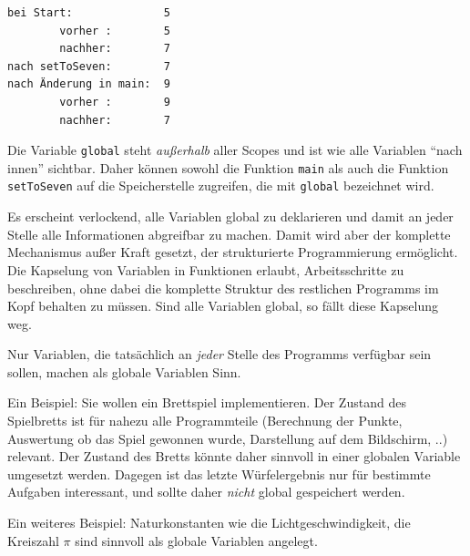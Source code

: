 \begin{cmdbox}
\begin{verbatim}
bei Start:              5
        vorher :        5
        nachher:        7
nach setToSeven:        7
nach Änderung in main:  9
        vorher :        9
        nachher:        7
\end{verbatim}
\end{cmdbox}

Die Variable \texttt{global} steht \emph{außerhalb} aller Scopes und ist wie alle Variablen \enquote{nach innen} sichtbar. Daher können sowohl die Funktion \texttt{main} als auch die Funktion \texttt{setToSeven} auf die Speicherstelle zugreifen, die mit \texttt{global} bezeichnet wird.

\begin{warnbox}
Es erscheint verlockend, alle Variablen global zu deklarieren und damit an jeder Stelle alle Informationen abgreifbar zu machen. Damit wird aber der komplette Mechanismus außer Kraft gesetzt, der strukturierte Programmierung ermöglicht. Die Kapselung von Variablen in Funktionen erlaubt, Arbeitsschritte zu beschreiben, ohne dabei die komplette Struktur des restlichen Programms im Kopf behalten zu müssen. Sind alle Variablen global, so fällt diese Kapselung weg.

Nur Variablen, die tatsächlich an \emph{jeder} Stelle des Programms verfügbar sein sollen, machen als globale Variablen Sinn.

Ein Beispiel: Sie wollen ein Brettspiel implementieren. Der Zustand des Spielbretts ist für nahezu alle Programmteile (\eg Berechnung der Punkte, Auswertung ob das Spiel gewonnen wurde, Darstellung auf dem Bildschirm, ..) relevant. Der Zustand des Bretts könnte daher sinnvoll in einer globalen Variable umgesetzt werden. Dagegen ist das letzte Würfelergebnis nur für bestimmte Aufgaben interessant, und sollte daher \emph{nicht} global gespeichert werden.

Ein weiteres Beispiel: Naturkonstanten wie die Lichtgeschwindigkeit, die Kreiszahl $\pi$ sind sinnvoll als globale Variablen angelegt.
\end{warnbox}

